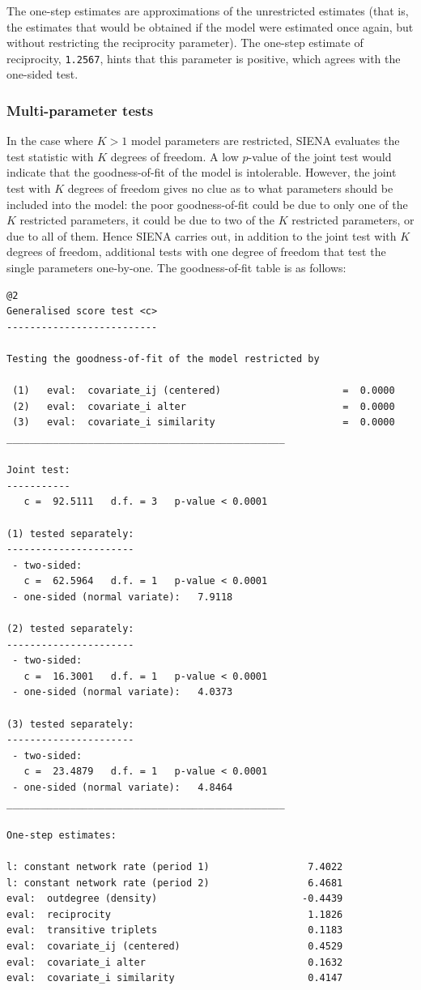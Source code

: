 \documentclass[a4paper,fleqn,11pt]{article}
\newcommand{\+}{\, + \,}
\newcommand{\SI}{{\sf SIENA }}
\begin{document}
The one-step estimates are approximations of the unrestricted estimates (that is,
the estimates that would be obtained if the model were estimated once again,
but without restricting the reciprocity parameter).
The one-step estimate of reciprocity, {\tt 1.2567},
hints that this parameter is positive,
which agrees with the one-sided test.

\subsubsection{Multi-parameter tests}

In the case where $K > 1$ model parameters are restricted, \SI
evaluates the test statistic with $K$ degrees of freedom. A low
$p$-value of the joint test would indicate that the
goodness-of-fit of the model is intolerable. However, the joint
test with $K$ degrees of freedom gives no clue as to what parameters
should be included into the model: the poor goodness-of-fit could be
due to only one of the $K$ restricted parameters, it could be due to
two of the $K$ restricted parameters, or due to all of them. Hence
\SI carries out, in addition to the joint test with $K$ degrees of
freedom, additional tests with one degree of freedom that test the
single parameters one-by-one. The goodness-of-fit table is as
follows:

{\footnotesize
\begin{verbatim}
@2
Generalised score test <c>
--------------------------

Testing the goodness-of-fit of the model restricted by

 (1)   eval:  covariate_ij (centered)                     =  0.0000
 (2)   eval:  covariate_i alter                           =  0.0000
 (3)   eval:  covariate_i similarity                      =  0.0000
________________________________________________

Joint test:
-----------
   c =  92.5111   d.f. = 3   p-value < 0.0001

(1) tested separately:
----------------------
 - two-sided:
   c =  62.5964   d.f. = 1   p-value < 0.0001
 - one-sided (normal variate):   7.9118

(2) tested separately:
----------------------
 - two-sided:
   c =  16.3001   d.f. = 1   p-value < 0.0001
 - one-sided (normal variate):   4.0373

(3) tested separately:
----------------------
 - two-sided:
   c =  23.4879   d.f. = 1   p-value < 0.0001
 - one-sided (normal variate):   4.8464
________________________________________________

One-step estimates:

l: constant network rate (period 1)                 7.4022
l: constant network rate (period 2)                 6.4681
eval:  outdegree (density)                         -0.4439
eval:  reciprocity                                  1.1826
eval:  transitive triplets                          0.1183
eval:  covariate_ij (centered)                      0.4529
eval:  covariate_i alter                            0.1632
eval:  covariate_i similarity                       0.4147
\end{verbatim}
}
\end{document}
